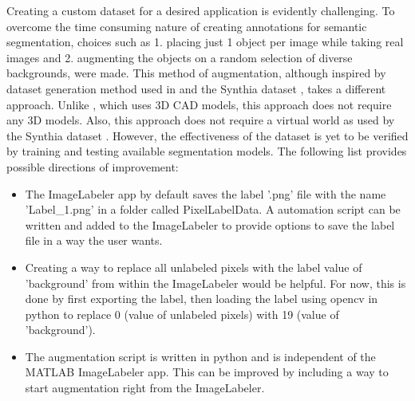 Creating a custom dataset for a desired application is evidently challenging. To overcome the time consuming nature of creating annotations for semantic segmentation, choices such as 1. placing just 1 object per image while taking real images and 2. augmenting the objects on a random selection of diverse backgrounds, were made. This method of augmentation, although inspired by dataset generation method used in \cite{DBLP:journals/corr/abs-1709-00849} and the Synthia dataset \cite{RosCVPR16}, takes a different approach. Unlike \cite{DBLP:journals/corr/abs-1709-00849}, which uses 3D CAD models, this approach does not require any 3D models. Also, this approach does not require a virtual world as used by the Synthia dataset \cite{RosCVPR16}. However, the effectiveness of the dataset is yet to be verified by training and testing available segmentation models.
The following list provides possible directions of improvement:
	\begin{itemize}
		\item The ImageLabeler app by default saves the label '.png' file with the name 'Label\_1.png' in a folder called PixelLabelData. A automation script can be written and added to the ImageLabeler to provide options to save the label file in a way the user wants.
		\item Creating a way to replace all unlabeled pixels with the label value of 'background' from within the ImageLabeler would be helpful. For now, this is done by first exporting the label, then loading the label using opencv in python to replace 0 (value of unlabeled pixels) with 19 (value of 'background').
		\item The augmentation script is written in python and is independent of the MATLAB ImageLabeler app. This can be improved by including a way to start augmentation right from the ImageLabeler.
	\end{itemize}

